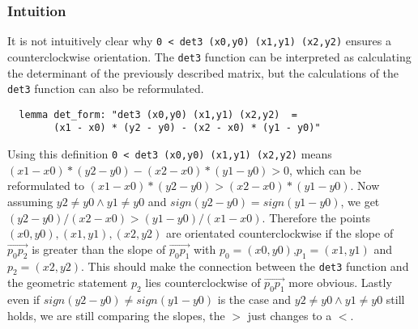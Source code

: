 \subsubsection{Intuition}
\label{det3:intuition}
It is not intuitively clear why \lstinline|0 < det3 (x0,y0) (x1,y1) (x2,y2)| ensures a 
counterclockwise orientation. The \lstinline|det3| function can  be interpreted as calculating 
the determinant of the previously described matrix, but the calculations of the \lstinline|det3|
function can also be reformulated.
\begin{lstlisting}
  lemma det_form: "det3 (x0,y0) (x1,y1) (x2,y2)  =  
        (x1 - x0) * (y2 - y0) - (x2 - x0) * (y1 - y0)" 
\end{lstlisting}
Using this definition \lstinline|0 < det3 (x0,y0) (x1,y1) (x2,y2)| means \newline
$(x1 - x0) * (y2 - y0) - (x2 - x0) * (y1 - y0) > 0$,
which can be reformulated to \newline
$(x1 - x0) * (y2 - y0) >  (x2 - x0) * (y1 - y0)$.
Now assuming $y2 \neq y0 \land y1 \neq y0$ and $sign(y2 - y0) = sign (y1 - y0)$, we get
 $(y2 - y0) / (x2 - x0) >   (y1 - y0) / (x1 - x0)$. Therefore the points 
$(x0,y0),(x1,y1),(x2,y2)$ are orientated counterclockwise if the slope of
$\overrightarrow{p_0 p_2}$ is greater than the slope of $\overrightarrow{p_0 p_1}$
with $p_0 = (x0,y0)$,$p_1 = (x1,y1)$ and $p_2 = (x2,y2)$. 
This should make the connection between the \lstinline|det3| function and the geometric
statement $p_2$ lies counterclockwise of $\overrightarrow{p_0 p_1}$ more obvious.
Lastly even if $sign(y2 - y0) \neq sign (y1 - y0)$ is the case 
and $y2 \neq y0 \land y1 \neq y0 $ still holds, we are still comparing the slopes, the $>$ just 
changes to a $<$.


